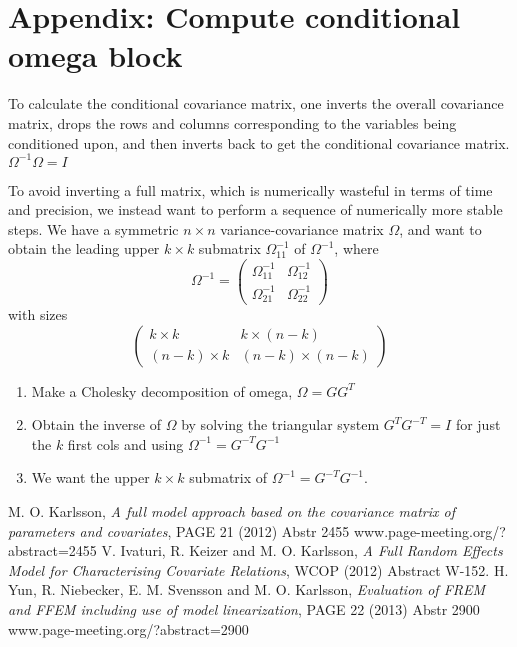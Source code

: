 \section{Appendix: Compute conditional omega block}
To calculate the conditional covariance matrix, 
one inverts the overall covariance matrix, 
drops the rows and columns corresponding to the variables being conditioned upon, and then inverts back to get the conditional covariance matrix.
\begin{math}
\Omega^{-1}\Omega = I
\end{math}

To avoid inverting a full matrix, which is numerically wasteful in terms of time and precision, we instead want to perform a sequence of numerically more stable steps.
We have a symmetric $n\times n$ variance-covariance matrix $\Omega$, and want to obtain the leading upper $k\times k$ submatrix $\Omega^{-1}_{11}$
of $\Omega^{-1}$, where
\[
\Omega^{-1} = \left( \begin{array}{cc}
\Omega^{-1}_{11} & \Omega^{-1}_{12}\\
\Omega^{-1}_{21} & \Omega^{-1}_{22} 
\end{array} \right)
\] with sizes \[
\left(
\begin{array}{cc}
k\times k & k\times (n-k)\\
(n-k)\times k & (n-k)\times (n-k) 
\end{array}
\right)
\] 
\begin{enumerate}
\item Make a Cholesky decomposition of omega, $\Omega=GG^T$
\item Obtain the inverse of $\Omega$ by solving the triangular system $G^{T}G^{-T}=I$ for just the $k$ first cols and using $\Omega^{-1}=G^{-T}G^{-1}$
\item We want the upper $k\times k$ submatrix of $\Omega^{-1}=G^{-T}G^{-1}$.
\end{enumerate}

\begin{thebibliography}{99}
 M. O. Karlsson,
{\em A full model approach based on the covariance matrix of parameters and covariates},
PAGE 21 (2012) Abstr 2455 \mbox{www.page-meeting.org/?abstract=2455} 
V. Ivaturi, R. Keizer and M. O. Karlsson,
{\em A Full Random Effects Model for Characterising Covariate Relations},
WCOP (2012) Abstract W-152.
H. Yun, R. Niebecker, E. M. Svensson and M. O. Karlsson,       
{\em Evaluation of FREM and FFEM including use of model linearization},
PAGE 22 (2013) Abstr 2900 \mbox{www.page-meeting.org/?abstract=2900}    
\end{thebibliography}     
                          



